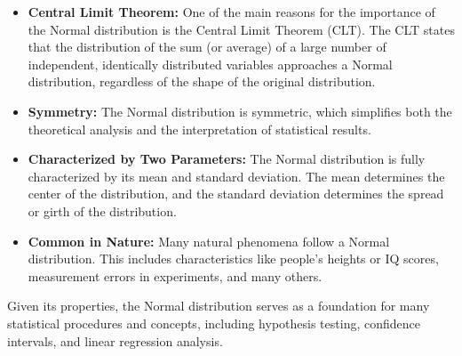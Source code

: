 \begin{itemize}
\item \textbf{Central Limit Theorem:} One of the main reasons for the
  importance of the Normal distribution is the Central Limit Theorem
  (CLT). The CLT states that the distribution of the sum (or average)
  of a large number of independent, identically distributed variables
  approaches a Normal distribution, regardless of the shape of the
  original distribution.

\item \textbf{Symmetry:} The Normal distribution is symmetric, which
  simplifies both the theoretical analysis and the interpretation of
  statistical results.

\item \textbf{Characterized by Two Parameters:} The Normal
  distribution is fully characterized by its mean and standard
  deviation. The mean determines the center of the distribution, and
  the standard deviation determines the spread or girth of the
  distribution.

\item \textbf{Common in Nature:} Many natural phenomena follow a
  Normal distribution. This includes characteristics like people's
  heights or IQ scores, measurement errors in experiments, and many
  others.
\end{itemize}

Given its properties, the Normal distribution serves as a foundation
for many statistical procedures and concepts, including hypothesis
testing, confidence intervals, and linear regression analysis.
